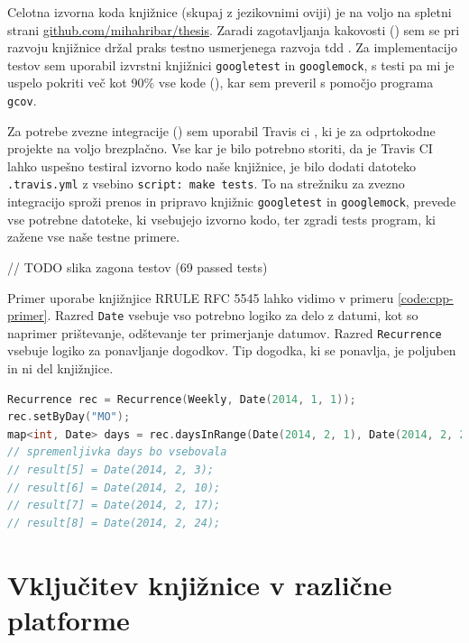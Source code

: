 Celotna izvorna koda knjižnice (skupaj z jezikovnimi oviji) je na voljo na spletni strani \href{https://github.com/mihahribar/thesis}{github.com/mihahribar/thesis}. Zaradi zagotavljanja kakovosti () sem se pri razvoju knjižnice držal praks testno usmerjenega razvoja \gls{tdd} \cite{tdd-cpp}. Za implementacijo testov sem uporabil izvrstni knjižnici \texttt{googletest}\cite{googletest} in \texttt{googlemock}\cite{googlemock}, s testi pa mi je uspelo pokriti več kot 90\% vse kode (), kar sem preveril s pomočjo programa \texttt{gcov}.

Za potrebe zvezne integracije () sem uporabil Travis \gls{ci} \cite{travisci}, ki je za odprtokodne projekte na voljo brezplačno. Vse kar je bilo potrebno storiti, da je Travis CI lahko uspešno testiral izvorno kodo naše knjižnice, je bilo dodati datoteko \texttt{.travis.yml} z vsebino \texttt{script: make tests}. To na strežniku za zvezno integracijo sproži prenos in pripravo knjižnic \texttt{googletest} in \texttt{googlemock}, prevede vse potrebne datoteke, ki vsebujejo izvorno kodo, ter zgradi tests program, ki zažene vse naše testne primere.

// TODO slika zagona testov (69 passed tests)

Primer uporabe knjižnjice RRULE RFC 5545 lahko vidimo v primeru \ref{code:cpp-primer}. Razred \texttt{Date} vsebuje vso potrebno logiko za delo z datumi, kot so naprimer prištevanje, odštevanje ter primerjanje datumov. Razred \texttt{Recurrence} vsebuje logiko za ponavljanje dogodkov. Tip dogodka, ki se ponavlja, je poljuben in ni del knjižnjice.

\begin{lstlisting}[caption={Primer uporabe C++ knjižnjice RRULE standarda RFC 5545. Izbrani dogodek bi se s tem pravilom ponavljal tedensko, vsak ponedeljek, od 1. januarja 2014 naprej.}, label=code:cpp-primer, language=C++]
Recurrence rec = Recurrence(Weekly, Date(2014, 1, 1));
rec.setByDay("MO");
map<int, Date> days = rec.daysInRange(Date(2014, 2, 1), Date(2014, 2, 28));
// spremenljivka days bo vsebovala
// result[5] = Date(2014, 2, 3);
// result[6] = Date(2014, 2, 10);
// result[7] = Date(2014, 2, 17);
// result[8] = Date(2014, 2, 24);
\end{lstlisting}

\chapter{Vključitev knjižnice v različne platforme}
\label{chap:cross-platform}


